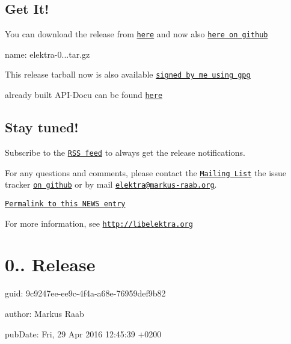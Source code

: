 \subsection*{Get It!}

You can download the release from \href{http://www.libelektra.org/ftp/elektra/releases/elektra-0.8.17.tar.gz}{\tt here} and now also \href{https://github.com/ElektraInitiative/ftp/tree/master/releases/elektra-0.8.17.tar.gz}{\tt here on github}


\begin{DoxyItemize}
\item name\+: elektra-\/0...\+tar.\+gz
\end{DoxyItemize}

This release tarball now is also available \href{http://www.libelektra.org/ftp/elektra/releases/elektra-0.8.17.tar.gz.gpg}{\tt signed by me using gpg}

already built A\+P\+I-\/\+Docu can be found \href{http://doc.libelektra.org/api/0.8.17/html/}{\tt here}

\subsection*{Stay tuned!}

Subscribe to the \href{http://doc.libelektra.org/news/feed.rss}{\tt R\+S\+S feed} to always get the release notifications.

For any questions and comments, please contact the \href{https://lists.sourceforge.net/lists/listinfo/registry-list}{\tt Mailing List} the issue tracker \href{http://git.libelektra.org/issues}{\tt on github} or by mail \href{mailto:elektra@markus-raab.org}{\tt elektra@markus-\/raab.\+org}.

\href{http://doc.libelektra.org/news/e6153a39-c4bd-41c3-bc86-785d451eb6c5.html}{\tt Permalink to this N\+E\+W\+S entry}

For more information, see \href{http://libelektra.org}{\tt http\+://libelektra.\+org}

\section*{0.. Release}


\begin{DoxyItemize}
\item guid\+: 9c9247ee-\/ee9c-\/4f4a-\/a68e-\/76959def9b82
\item author\+: Markus Raab
\item pub\+Date\+: Fri, 29 Apr 2016 12\+:45\+:39 +0200
\end{DoxyItemize}

